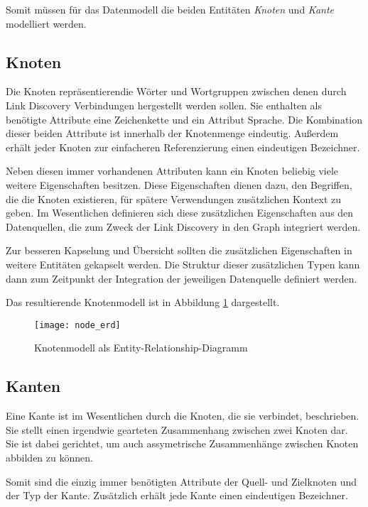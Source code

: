 Somit müssen für das Datenmodell die beiden Entitäten \emph{Knoten} und \emph{Kante} modelliert werden.

\subsection{Knoten}

Die Knoten repräsentierendie Wörter und Wortgruppen zwischen denen durch Link Discovery Verbindungen hergestellt werden sollen. Sie enthalten als benötigte Attribute eine Zeichenkette und ein Attribut Sprache. Die Kombination dieser beiden Attribute ist innerhalb der Knotenmenge eindeutig. Außerdem erhält jeder Knoten zur einfacheren Referenzierung einen eindeutigen Bezeichner.

Neben diesen immer vorhandenen Attributen kann ein Knoten beliebig viele weitere Eigenschaften besitzen. Diese Eigenschaften dienen dazu, den Begriffen, die die Knoten existieren, für spätere Verwendungen zusätzlichen Kontext zu geben. Im Wesentlichen definieren sich diese zusätzlichen Eigenschaften aus den Datenquellen, die zum Zweck der Link Discovery in den Graph integriert werden.

Zur besseren Kapselung und Übersicht sollten die zusätzlichen Eigenschaften in weitere Entitäten gekapselt werden. Die Struktur dieser zusätzlichen Typen kann dann zum Zeitpunkt der Integration der jeweiligen Datenquelle definiert werden.

Das resultierende Knotenmodell ist in Abbildung \ref{fig:node_erd} dargestellt.

\begin{figure}
\label{fig:node_erd}
\begin{center}
    \texttt{[image: node\_erd]}
\end{center}
\caption{Knotenmodell als Entity-Relationship-Diagramm}
\end{figure}

\subsection{Kanten}

Eine Kante ist im Wesentlichen durch die Knoten, die sie verbindet, beschrieben. Sie stellt einen irgendwie gearteten Zusammenhang zwischen zwei Knoten dar. Sie ist dabei gerichtet, um auch assymetrische Zusammenhänge zwischen Knoten abbilden zu können.

Somit sind die einzig immer benötigten Attribute der Quell- und Zielknoten und der Typ der Kante. Zusätzlich erhält jede Kante einen eindeutigen Bezeichner.

